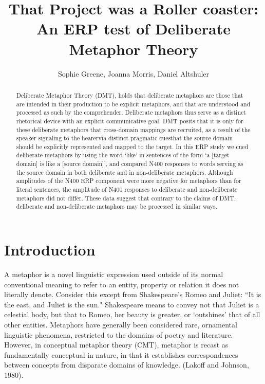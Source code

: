 \documentclass[]{article}
\title{That Project was a Roller coaster: An ERP test of Deliberate Metaphor Theory}
\author{Sophie Greene, Joanna Morris, Daniel Altshuler}
\begin{document}
\maketitle

\begin{abstract}

	Deliberate Metaphor Theory (DMT), holds that deliberate metaphors are those that are intended in their production to be explicit metaphors, and that are understood and processed as such by the comprehender. Deliberate metaphors thus serve as a distinct rhetorical device with an explicit communicative goal. DMT posits that it is only for these deliberate metaphors that cross-domain mappings are recruited, as a result of the speaker signaling to the hearer\textemdash via distinct pragmatic cues\textemdash that the source domain should be explicitly represented and mapped to the target. In this ERP study we cued deliberate metaphors by using the word ‘like’ in sentences of the form ‘a [target domain] is like a [source domain]’, and compared N400 responses to words serving as the source domain in both deliberate and in non-deliberate metaphors. Although amplitudes of the N400 ERP component were more negative for metaphors than for literal sentences, the amplitude of N400 responses to deliberate and non-deliberate metaphors did not differ. These data suggest that contrary to the claims of DMT, deliberate and non-deliberate metaphors may be processed in similar ways.

\end{abstract}

\section{Introduction}

	
    A metaphor is a novel linguistic expression used outside of its normal conventional meaning to refer to an entity, property or relation it does not literally denote. Consider this except from Shakespeare's Romeo and Juliet: ``It is the east, and Juliet is the sun."  Shakespeare means to convey not that Juliet is a celestial body, but that to Romeo, her beauty is greater, or `outshines' that of all other entities.  
	Metaphors have generally been considered rare, ornamental linguistic phenomena, restricted to the domains of poetry and literature.  However, in conceptual metaphor theory (CMT), metaphor is recast as fundamentally conceptual in nature, in that it establishes correspondences between concepts from disparate domains of knowledge\parencite{lakoff_conceptual_1980}. (Lakoff and Johnson, 1980). 
	
\end{document}
